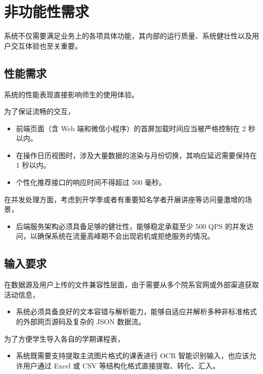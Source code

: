 \documentclass[UTF8,a4paper,12pt,fontset=none]{ctexrep}
\begin{document}
\chapter{非功能性需求}

系统不仅需要满足业务上的各项具体功能，其内部的运行质量、系统健壮性以及用户交互体验也至关重要。

\section{性能需求}

系统的性能表现直接影响师生的使用体验。

为了保证流畅的交互，

\begin{itemize}[leftmargin=2.5em]
\item 前端页面（含 Web 端和微信小程序）的首屏加载时间应当被严格控制在 2 秒以内。
\item 在操作日历视图时，涉及大量数据的渲染与月份切换，其响应延迟需要保持在 1 秒以内。
\item 个性化推荐接口的响应时间不得超过 500 毫秒。
\end{itemize}

在并发处理方面，考虑到开学季或者有重要知名学者开展讲座等访问量激增的场景，

\begin{itemize}[leftmargin=2.5em]
\item 后端服务架构必须具备足够的健壮性，能够稳定承载至少 500 QPS 的并发访问，以确保系统在流量高峰期不会出现宕机或拒绝服务的情况。
\end{itemize}

\section{输入要求}

在数据源及用户上传的文件兼容性层面，由于需要从多个院系官网或外部渠道获取活动信息，

\begin{itemize}[leftmargin=2.5em]
\item 系统必须具备良好的文本容错与解析能力，能够自适应并解析多种非标准格式的外部网页源码及复杂的 JSON 数据流。
\end{itemize}

为了方便学生导入各自的学期课程表，

\begin{itemize}[leftmargin=2.5em]
\item 系统既需要支持提取主流图片格式的课表进行 OCR 智能识别输入，也应该允许用户通过 Excel 或 CSV 等结构化格式直接提取、转化、汇入。
\end{itemize}
\end{document}
